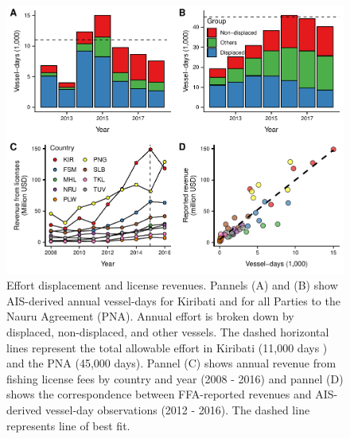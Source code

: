 \documentclass[12pt]{article}
\begin{document}
\begin{figure}[htbp]
\centering
\includegraphics{img/empirical.pdf}
\caption{\label{fig:empirical}Effort displacement and license revenues. Pannels (A) and (B) show AIS-derived annual vessel-days for Kiribati and for all Parties to the Nauru Agreement (PNA). Annual effort is broken down by displaced, non-displaced, and other vessels. The dashed horizontal lines represent the total allowable effort in Kiribati (11,000 days \cite{yeeting2018stabilising}) and the PNA (45,000 days). Pannel (C) shows annual revenue from fishing license fees by country and year (2008 - 2016) and pannel (D) shows the correspondence between FFA-reported revenues and AIS-derived vessel-day observations (2012 - 2016). The dashed line represents line of best fit.}
\end{figure}
\end{document}
